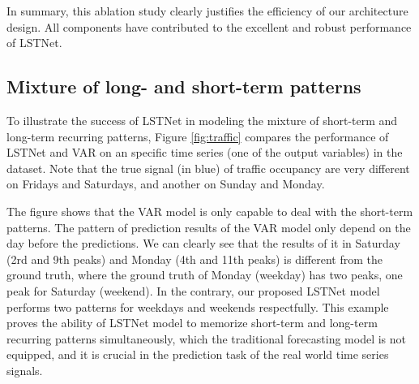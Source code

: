 
In summary, this ablation study clearly justifies the efficiency of our architecture design. All components have contributed to the excellent and robust performance of LSTNet.
\fi


\subsection{Mixture of long- and short-term patterns}
\label{sec:mixture}
To illustrate the success of LSTNet in modeling the mixture of short-term and long-term recurring patterns, Figure \ref{fig:traffic} compares the performance of LSTNet and VAR on an specific time series (one of the output variables) in the \traffic dataset. Note that the true signal (in blue) of traffic occupancy are very different on Fridays and Saturdays, and another on Sunday and Monday.

The figure shows that the VAR model is only capable to deal with the short-term patterns. The pattern of prediction results of the VAR model only depend on the day before the predictions. We can clearly see that the results of it in Saturday (2rd and 9th peaks) and Monday (4th and 11th peaks) is different from the ground truth, where the ground truth of Monday (weekday) has two peaks, one peak for Saturday (weekend). In the contrary, our proposed LSTNet model performs two patterns for weekdays and weekends respectfully. This example proves the ability of LSTNet model to memorize short-term and long-term recurring patterns simultaneously, which the traditional forecasting model is not equipped, and it is crucial in the prediction task of the real world time series signals. 




